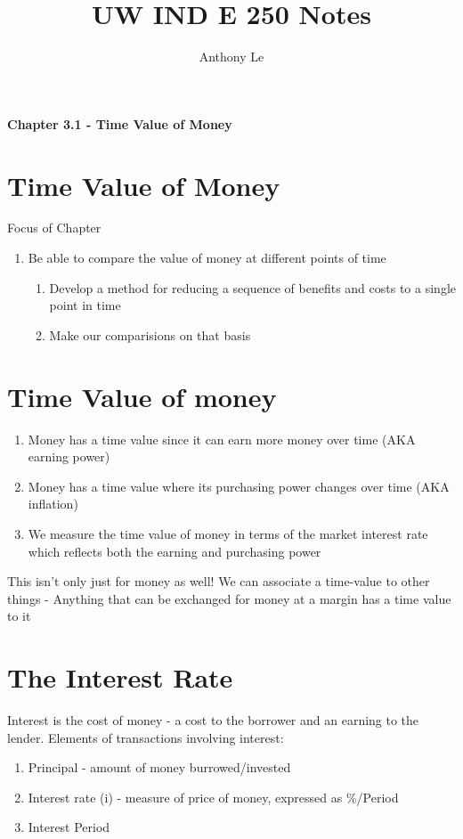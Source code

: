 \documentclass{report} %
\title{UW IND E 250 Notes}
\author{Anthony Le}
\begin{document}
\pagestyle{fancy}
\fancyhead{}

\begin{center}
    \LARGE{\textbf{Chapter 3.1 - Time Value of Money}}
\end{center}

\section*{Time Value of Money}
Focus of Chapter
\begin{enumerate}
    \item Be able to compare the value of money at different points of time
    \begin{enumerate}
         \item Develop a method for reducing a sequence of benefits and costs to a single point in time 
        \item Make our comparisions on that basis
    \end{enumerate}
\end{enumerate}
\section*{Time Value of money}
\begin{enumerate}
    \item Money has a time value since it can earn more money over time (AKA earning power)
    \item Money has a time value where its purchasing power changes over time (AKA inflation)
    \item We measure the time value of money in terms of the market interest rate which reflects both the earning and purchasing power
\end{enumerate}
This isn't only just for money as well! We can associate a time-value to other things - Anything that can be exchanged for money at a margin has a time value to it

\section*{The Interest Rate}
Interest is the cost of money - a cost to the borrower and an earning to the lender.
\newline
Elements of transactions involving interest:
\begin{enumerate}
    \item Principal - amount of money burrowed/invested
    \item Interest rate (i) - measure of price of money, expressed as \%/Period
    \item Interest Period
\end{enumerate}
\end{document}
